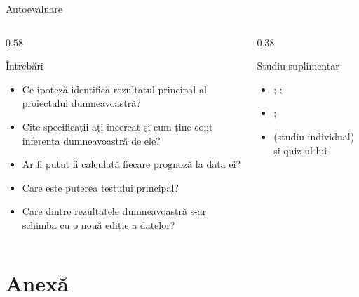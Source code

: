 \begin{frame}{Autoevaluare}
\itemsize{\small}
\begin{columns}[T]
\begin{column}{0.58\textwidth}
\begin{block}{Întrebări}
\begin{itemize}
    \item Ce ipoteză identifică rezultatul principal al proiectului dumneavoastră?
    \item Cîte specificații ați încercat și cum ține cont inferența dumneavoastră de ele?
    \item Ar fi putut fi calculată fiecare prognoză la data ei?
    \item Care este puterea testului principal?
    \item Care dintre rezultatele dumneavoastră s-ar schimba cu o nouă ediție a datelor?
\end{itemize}
\end{block}
\end{column}
\begin{column}{0.38\textwidth}
\begin{block}{Studiu suplimentar}
\begin{itemize}
    \item {}; ; 
    \item {}; 
    \item {} (studiu individual) și quiz-ul lui
\end{itemize}
\end{block}
\end{column}
\end{columns}
\end{frame}


\section{Anexă}

